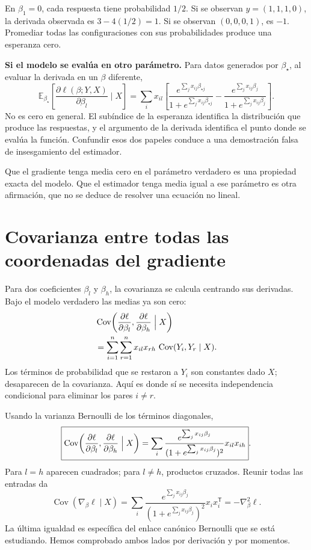 \documentclass[11pt,a4paper]{article}
\newcommand{\E}{\mathbb E}
\newcommand{\T}{^{\mathsf T}}
\DeclareMathOperator{\Cov}{Cov}
\begin{document}
\begin{ejemplo}
En $\beta_1=0$, cada respuesta tiene probabilidad $1/2$.
Si se observan $y=(1,1,1,0)$,
la derivada observada es $3-4(1/2)=1$.
Si se observan $(0,0,0,1)$, es $-1$.
Promediar todas las configuraciones con sus probabilidades
produce una esperanza cero.
\end{ejemplo}
\textbf{Si el modelo se evalúa en otro parámetro.}
Para datos generados por $\beta_\star$, al evaluar la derivada en
un $\beta$ diferente,
\[
\E_{\beta_\star}\!\left[
\frac{\partial\ell(\beta;Y,X)}{\partial\beta_l}\mid X\right]
=\sum_i x_{il}\left[
\frac{e^{\sum_jx_{ij}\beta_{\star j}}}{1+e^{\sum_jx_{ij}\beta_{\star j}}}
-\frac{e^{\sum_jx_{ij}\beta_j}}{1+e^{\sum_jx_{ij}\beta_j}}\right].
\]
No es cero en general. El subíndice de la esperanza identifica
la distribución que produce las respuestas, y el argumento de
la derivada identifica el punto donde se evalúa la función.
Confundir esos dos papeles conduce a una demostración falsa
de insesgamiento del estimador.

Que el gradiente tenga media cero en el parámetro verdadero
es una propiedad exacta del modelo.
Que el estimador tenga media igual a ese parámetro es otra afirmación,
que no se deduce de resolver una ecuación no lineal.

\clearpage
\section{Covarianza entre todas las coordenadas del gradiente}\label{logit33}
Para dos coeficientes $\beta_l$ y $\beta_h$, la covarianza se calcula
centrando sus derivadas. Bajo el modelo verdadero las medias ya son cero:
\[
\begin{aligned}
&\Cov\!\left(
\frac{\partial\ell}{\partial\beta_l},
\frac{\partial\ell}{\partial\beta_h}\Bigm|X\right)\\
&=\sum_{i=1}^n\sum_{r=1}^n x_{il}x_{rh}\,
\Cov(Y_i,Y_r\mid X).
\end{aligned}
\]
Los términos de probabilidad que se restaron a $Y_i$ son constantes dado
$X$; desaparecen de la covarianza.
Aquí es donde sí se necesita independencia condicional para
eliminar los pares $i\ne r$.

Usando la varianza Bernoulli de los términos diagonales,
\[
\boxed{
\Cov\!\left(
\frac{\partial\ell}{\partial\beta_l},
\frac{\partial\ell}{\partial\beta_h}\Bigm|X\right)
=\sum_i
\frac{e^{\sum_jx_{ij}\beta_j}}
{(1+e^{\sum_jx_{ij}\beta_j})^2}x_{il}x_{ih}}.
\]
Para $l=h$ aparecen cuadrados; para $l\ne h$, productos cruzados.
Reunir todas las entradas da
\[
\Cov(\nabla_\beta\ell\mid X)
=\sum_i
\frac{e^{\sum_jx_{ij}\beta_j}}
{(1+e^{\sum_jx_{ij}\beta_j})^2}x_ix_i\T
=-\nabla_\beta^2\ell.
\]
La última igualdad es específica del enlace canónico Bernoulli que se
está estudiando. Hemos comprobado ambos lados por derivación y por momentos.
\end{document}
